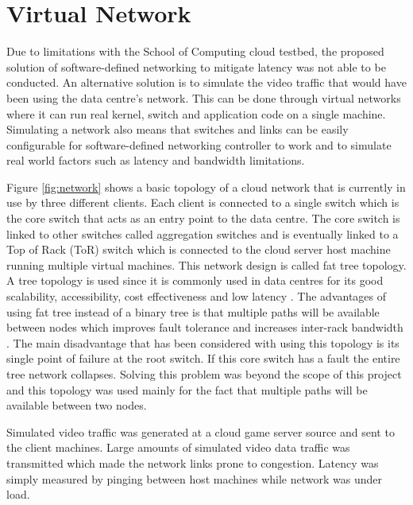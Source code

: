 \section{Virtual Network}
Due to limitations with the School of Computing cloud testbed, the proposed solution of software-defined networking to mitigate latency was not able to be conducted. An alternative solution is to simulate the video traffic that would have been using the data centre's network. This can be done through virtual networks where it can run real kernel, switch and application code on a single machine. Simulating a network also means that switches and links can be easily configurable for software-defined networking controller to work and to simulate real world factors such as latency and bandwidth limitations.
\newline
\par
Figure \ref{fig:network} shows a basic topology of a cloud network that is currently in use by three different clients. Each client is connected to a single switch which is the core switch that acts as an entry point to the data centre. The core switch is linked to other switches called aggregation switches and is eventually linked to a Top of Rack (ToR) switch which is connected to the cloud server host machine running multiple virtual machines. This network design is called fat tree topology. A tree topology is used since it is commonly used in data centres for its good scalability, accessibility, cost effectiveness and low latency \cite{wu2015cloud}. The advantages of using fat tree instead of a binary tree is that multiple paths will be available between nodes which improves fault tolerance and increases inter-rack bandwidth \cite{al2008scalable}. The main disadvantage that has been considered with using this topology is its single point of failure at the root switch. If this core switch has a fault the entire tree network collapses. Solving this problem was beyond the scope of this project and this topology was used mainly for the fact that multiple paths will be available between two nodes.
\newline
\par
Simulated video traffic was generated at a cloud game server source and sent to the client machines. Large amounts of simulated video data traffic was transmitted which made the network links prone to congestion. Latency was simply measured by pinging between host machines while network was under load.

